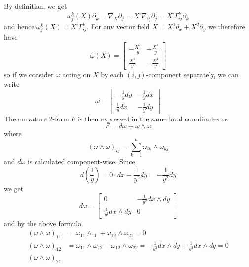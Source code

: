 \documentclass[a4paper, 12pt]{article}
\begin{document}
\begin{Exercise}
\begin{enumerate}[label=(\roman*)]
            By definition, we get
            \[
                \omega_j^k(X)\partial_k
                = \nabla_X\partial_j
                = X^i\nabla_{\partial_i}\partial_j
                = X^i\Gamma_{ij}^k\partial_k
            \]
            and hence $\omega_j^k(X) = X^i\Gamma_{ij}^k$.
            For any vector field $X = X^1 \partial_x + X^2\partial_y$ we therefore have
            \[
                \omega(X) =
                \begin{bmatrix}
                    -\frac{X^2}{y} & -\frac{X^1}{y} \\
                    \frac{X^1}{y} & -\frac{X^2}{y}
                \end{bmatrix}
            \]
            so if we consider $\omega$ acting on $X$ by each $(i, j)$-component separately, we can write
            \[
                \omega =
                \begin{bmatrix}
                    -\frac{1}{y}dy & -\frac{1}{y} dx \\
                    \frac{1}{y} dx & -\frac{1}{y} dy
                \end{bmatrix}
            \]
            The curvature $2$-form $F$ is then expressed in the same local coordinates as
            \[
                F = d\omega + \omega\wedge\omega
            \]
            where
            \[
                (\omega\wedge\omega)_{ij} = \sum_{k=1}^{n}\omega_{ik}\wedge\omega_{kj}
            \]
            and $d\omega$ is calculated component-wise.
            Since
            \[
                d\left( \frac{1}{y} \right) = 0\cdot dx - \frac{1}{y^2}dy = -\frac{1}{y^2}dy
            \]
            we get
            \[
                d\omega =
                \begin{bmatrix}
                    0 & -\frac{1}{y^2} dx \wedge dy \\
                    \frac{1}{y^2} dx\wedge dy & 0
                \end{bmatrix}
            \]
            and by the above formula
            \begin{align*}
                (\omega\wedge\omega)_{11}
                &= \omega_{11}\wedge_{11} + \omega_{12}\wedge\omega_{21}
                = 0 \\
                (\omega\wedge\omega)_{12}
                &= \omega_{11}\wedge\omega_{12} + \omega_{12}\wedge\omega_{22}
                = -\frac{1}{y^2}dx\wedge dy + \frac{1}{y^2}dx \wedge dy
                = 0 \\
                (\omega\wedge\omega)_{21}

\end{align*}
\end{enumerate}
\end{Exercise}
\end{document}
